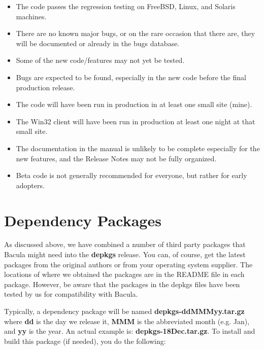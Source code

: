 \begin{itemize}
\item The code passes the regression testing on FreeBSD, Linux, and Solaris
  machines.

\item There are no known major bugs, or on the rare occasion that 
  there are, they will be documented or already in the bugs database.

\item Some of the new code/features may not yet be tested.

\item Bugs are expected to be found, especially in the new
  code before the final production release.

\item The code will have been run in production in at least one small
  site (mine).

\item The Win32 client will have been run in production at least
  one night at that small site.

\item The documentation in the manual is unlikely to be complete especially
  for the new features, and the Release Notes may not be fully
  organized.

\item Beta code is not generally recommended for everyone, but
  rather for early adopters.
\end{itemize}


\label{Dependency}
\section{Dependency Packages}

As discussed above, we have combined a number of third party packages that
Bacula might need into the {\bf depkgs} release. You can,
of course, get the latest packages from the original authors or 
from your operating system supplier. The locations of
where we obtained the packages are in the README file in each package.
However, be aware that the packages in the depkgs files have been tested by us
for compatibility with Bacula. 

Typically, a dependency package will be named {\bf depkgs-ddMMMyy.tar.gz}
where {\bf dd} is the day we release it, {\bf MMM}
is the abbreviated month (e.g. Jan), and {\bf yy} is the year. An actual
example is: {\bf depkgs-18Dec.tar.gz}. To install and build this package (if
needed), you do the following: 

